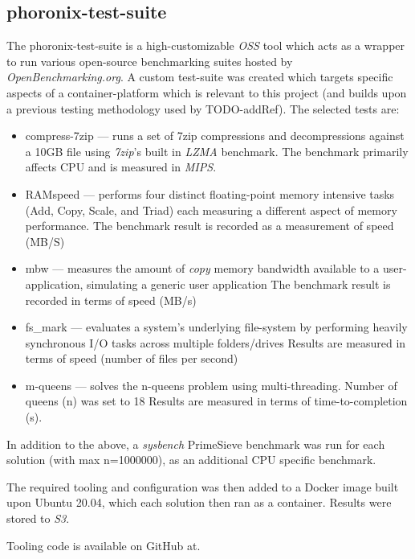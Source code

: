 \subsection{phoronix-test-suite}
The phoronix-test-suite is a high-customizable \emph{OSS} tool which acts as a wrapper to run various open-source benchmarking suites hosted by \emph{OpenBenchmarking.org}\cite{openbenchmarking.org_2020}.
A custom test-suite was created which targets specific aspects of a container-platform which is relevant to this project (and builds upon a previous testing methodology used by TODO-addRef).
The selected tests are:
\begin{itemize}
  \item compress-7zip\cite{7zip_lzma_benchmark} --- runs a set of 7zip compressions and decompressions against a 10GB file using \emph{7zip}'s built in \emph{LZMA} benchmark.
        The benchmark primarily affects CPU and is measured in \emph{MIPS}.
  \item RAMspeed\cite{hollander_bolotoff_2002} --- performs four distinct floating-point memory intensive tasks (Add, Copy, Scale, and Triad) each measuring a different aspect of memory performance.
        The benchmark result is recorded as a measurement of speed (MB/S)
  \item mbw\cite{raas_2022} --- measures the amount of \textit{copy} memory bandwidth available to a user-application, simulating a generic user application 
        The benchmark result is recorded in terms of speed (MB/s)
  \item fs\_mark\cite{josefbacik_2014} --- evaluates a system's underlying file-system by performing heavily synchronous I/O tasks across multiple folders/drives
        Results are measured in terms of speed (number of files per second)
  \item m-queens\cite{sudden6_2014} --- solves the n-queens\cite{sloman_quanta} problem using multi-threading. Number of queens (n) was set to 18
        Results are measured in terms of time-to-completion (s).
\end{itemize}
In addition to the above, a \emph{sysbench}\cite{akopytov_2020} PrimeSieve benchmark was run for each solution (with max n=1000000), as an additional CPU specific benchmark.


The required tooling and configuration was then added to a Docker image built upon Ubuntu 20.04\cite{ubuntu_wiki}, which each solution then ran as a container.
Results were stored to \emph{S3}.

Tooling code is available on GitHub at\cite{tool_benchmarking_suite}.

